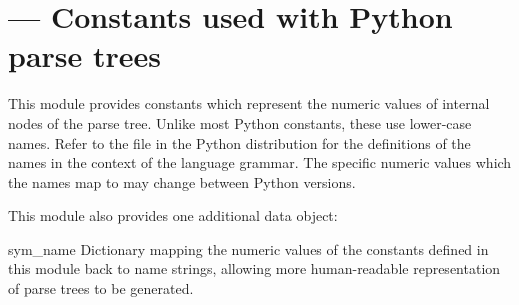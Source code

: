 \section{ ---
         Constants used with Python parse trees}



This module provides constants which represent the numeric values of
internal nodes of the parse tree.  Unlike most Python constants, these
use lower-case names.  Refer to the file  in the
Python distribution for the definitions of the names in the context of
the language grammar.  The specific numeric values which the names map
to may change between Python versions.

This module also provides one additional data object:



\begin{datadesc}{sym_name}
Dictionary mapping the numeric values of the constants defined in this
module back to name strings, allowing more human-readable
representation of parse trees to be generated.
\end{datadesc}

\begin{seealso}
\end{seealso}
